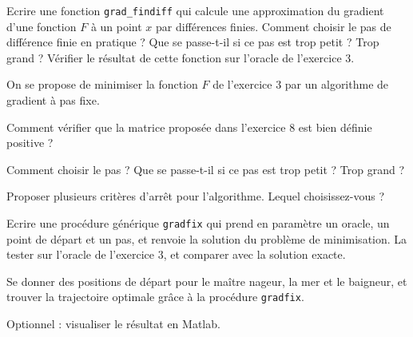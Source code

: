 \documentclass[12pt,a4paper,fleqn]{report}
\begin{document}
\begin{exercice}
  Ecrire une fonction \verb+grad_findiff+ qui calcule une
  approximation du gradient d'une fonction $F$ à un point $x$ par
  différences finies. Comment choisir le pas de différence finie en
  pratique ? Que se passe-t-il si ce pas est trop petit ? Trop grand ?
  Vérifier le résultat de cette fonction sur l'oracle de l'exercice 3.
\end{exercice}

\begin{exercice}
  On se propose de minimiser la fonction $F$ de l'exercice 3 par un
  algorithme de gradient à pas fixe.
  \begin{questions}
  \item Comment vérifier que la matrice proposée dans l'exercice 8 est
    bien définie positive ?
  \item Comment choisir le pas ? Que se passe-t-il si ce pas est trop
    petit ? Trop grand ?
  \item Proposer plusieurs critères d'arrêt pour l'algorithme. Lequel
    choisissez-vous ?
  \item Ecrire une procédure générique \verb+gradfix+ qui prend en
    paramètre un oracle, un point de départ et un pas, et renvoie la
    solution du problème de minimisation. La tester sur l'oracle de
    l'exercice 3, et comparer avec la solution exacte.
  \end{questions}

\end{exercice}

\begin{exercice}
  Se donner des positions de départ pour le maître nageur, la mer et
  le baigneur, et trouver la trajectoire optimale grâce à la procédure
  \verb+gradfix+.

  Optionnel : visualiser le résultat en Matlab.
\end{exercice}
\end{document}
